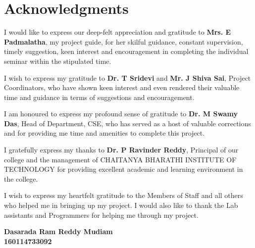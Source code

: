 \cleardoublepage
{}
{}
\chapter*{Acknowledgments}
I would like to express our deep-felt appreciation and gratitude to \textbf{Mrs. E Padmalatha}, my project guide, for her skilful guidance, constant supervision, timely suggestion, keen interest and encouragement in completing the individual seminar within the stipulated time.
\par
I wish to express my gratitude to \textbf{Dr. T Sridevi} and \textbf{Mr. J Shiva Sai}, Project Coordinators, who have shown keen interest and even rendered their valuable time and guidance in terms of suggestions and encouragement.
\par
I am honoured to express my profound sense of gratitude to \textbf{Dr. M Swamy Das}, Head of Department, CSE, who has served as a host of valuable corrections and for providing me time and amenities to complete this project.
\par
I gratefully express my thanks to \textbf{Dr. P Ravinder Reddy}, Principal of our college and the management of CHAITANYA BHARATHI INSTITUTE OF TECHNOLOGY for providing excellent academic and learning environment in the college.
\par
I wish to express my heartfelt gratitude to the Members of Staff and all others who helped me in bringing up my project. I would also like to thank the Lab assistants and Programmers for helping me through my project.
\\
\begin{flushright}
\begin{comment}\textbf{Karedla Anantha Sashi Sekhar}\\\textbf{160114733091}\\\end{comment}
\textbf{Dasarada Ram Reddy Mudiam}\\\textbf{160114733092}
\end{flushright}
\newpage
